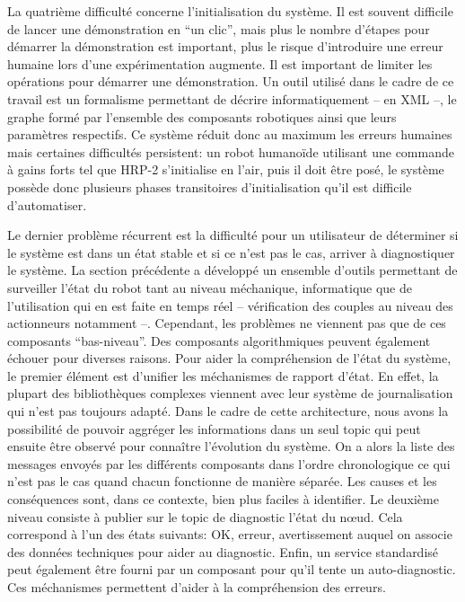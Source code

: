 La quatrième difficulté concerne l'initialisation du système. Il est
souvent difficile de lancer une démonstration en ``un clic'', mais
plus le nombre d'étapes pour démarrer la démonstration est important,
plus le risque d'introduire une erreur humaine lors d'une
expérimentation augmente. Il est important de limiter les opérations
pour démarrer une démonstration. Un outil utilisé dans le cadre de ce
travail est un formalisme permettant de décrire informatiquement -- en
XML --, le graphe formé par l'ensemble des composants
robotiques ainsi que leurs paramètres respectifs. Ce système réduit
donc au maximum les erreurs humaines mais certaines difficultés
persistent: un robot humanoïde utilisant une commande à gains forts
tel que HRP-2 s'initialise en l'air, puis il doit être posé, le
système possède donc plusieurs phases transitoires d'initialisation
qu'il est difficile d'automatiser.


Le dernier problème récurrent est la difficulté pour un utilisateur de
déterminer si le système est dans un état stable et si ce n'est pas le
cas, arriver à diagnostiquer le système. La section précédente a
développé un ensemble d'outils permettant de surveiller l'état du
robot tant au niveau méchanique, informatique que de l'utilisation qui
en est faite en temps réel -- vérification des couples au niveau des
actionneurs notamment --. Cependant, les problèmes ne viennent pas que
de ces composants ``bas-niveau''. Des composants algorithmiques
peuvent également échouer pour diverses raisons. Pour aider la
compréhension de l'état du système, le premier élément est d'unifier
les méchanismes de rapport d'état. En effet, la plupart des
bibliothèques complexes viennent avec leur système de journalisation
qui n'est pas toujours adapté. Dans le cadre de cette architecture,
nous avons la possibilité de pouvoir aggréger les informations dans un
seul topic qui peut ensuite être observé pour connaître l'évolution du
système. On a alors la liste des messages envoyés par les différents
composants dans l'ordre chronologique ce qui n'est pas le cas quand
chacun fonctionne de manière séparée. Les causes et les conséquences
sont, dans ce contexte, bien plus faciles à identifier. Le deuxième
niveau consiste à publier sur le topic de diagnostic l'état du n\oe ud.
Cela correspond à l'un des états suivants: OK, erreur,
avertissement auquel on associe des données techniques pour aider au
diagnostic. Enfin, un service standardisé peut également être fourni
par un composant pour qu'il tente un auto-diagnostic. Ces méchanismes
permettent d'aider à la compréhension des erreurs.



